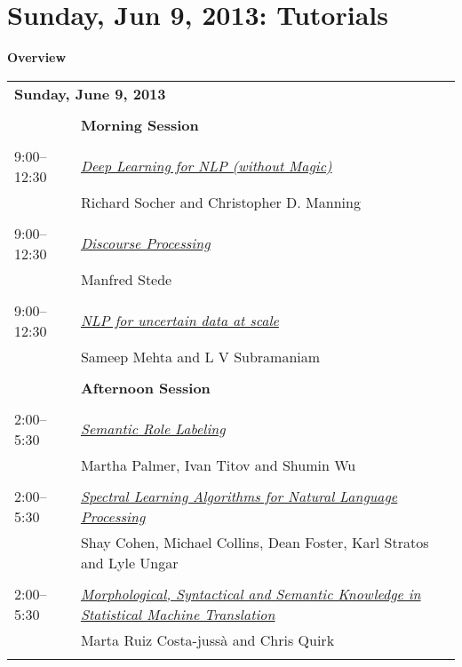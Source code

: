 \chapter{Sunday, Jun 9, 2013: Tutorials}
\thispagestyle{emptyheader}
\vspace{-3em}
\sloppy
\setlength{\parindent}{0in}
\setlength{\parskip}{2ex}
\renewcommand{\baselinestretch}{0.87}

\begin{center}
{\Large \bf
  Overview
}
\end{center}
\vspace{3mm}
\begin{tabular}{p{20mm}p{128mm}}
\multicolumn{2}{l}{\bf Sunday, June 9, 2013} \\
\\
 & {\bf Morning Session} \\
\\
9:00--12:30 & \hyperlink{page.1}{\em Deep Learning for NLP (without Magic)}\\
         & Richard Socher and Christopher D. Manning \\
\\

9:00--12:30 & \hyperlink{page.4}{\em Discourse Processing}\\
         & Manfred Stede \\
\\

9:00--12:30 & \hyperlink{page.7}{\em NLP for uncertain data at scale}\\
         & Sameep Mehta and L V Subramaniam \\
\\

 & {\bf Afternoon Session} \\
\\
2:00--5:30 & \hyperlink{page.10}{\em Semantic Role Labeling}\\
         & Martha Palmer, Ivan Titov and Shumin Wu \\
\\

2:00--5:30 & \hyperlink{page.13}{\em Spectral Learning Algorithms for Natural Language Processing}\\
         & Shay Cohen, Michael Collins, Dean Foster, Karl Stratos and Lyle Ungar \\
\\

2:00--5:30 & \hyperlink{page.16}{\em Morphological, Syntactical and Semantic Knowledge in Statistical Machine Translation}\\
         & Marta Ruiz Costa-juss\`{a} and Chris Quirk \\
\\

\end{tabular}


